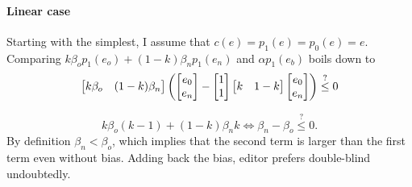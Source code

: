 \documentclass[12pt]{article}
\begin{document}
\paragraph{Linear case} Starting with the simplest, I assume that $c(e)=p_1(e)=p_0(e)=e$. Comparing
$k\beta_o p_1(e_o) + (1-k)\beta_n p_1(e_n)$ and $\alpha p_1(e_b)$ boils down to
\begin{equation*}
    \begin{bmatrix}
        k\beta_o & (1-k)\beta_n
    \end{bmatrix}
    \left(
        \begin{bmatrix}
            e_0 \\ e_n
        \end{bmatrix}
        -
        \begin{bmatrix}
            1 \\ 1
        \end{bmatrix}
        \begin{bmatrix}
            k & 1-k
        \end{bmatrix}
        \begin{bmatrix}
            e_0 \\ e_n
        \end{bmatrix}\right)
    \stackrel{?}{\leq} 0
\end{equation*}

\begin{equation*}
    k\beta_o (k-1)+(1-k)\beta_n k  \Leftrightarrow \beta_n-\beta_o \stackrel{?}{\leq} 0.
\end{equation*}
By definition $\beta_n<\beta_o$, which implies that the second term is larger than the first term even without bias. Adding back the bias, editor prefers double-blind undoubtedly.
\end{document}
